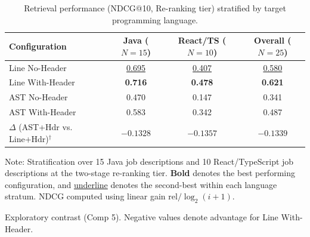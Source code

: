 \begin{table}[t]
\caption{Retrieval performance (NDCG@10, Re-ranking tier) stratified by target programming language.}
\label{tab:language_stratification}
\centering\footnotesize
\setlength{\tabcolsep}{10pt}
\begin{threeparttable}
\begin{tabular}{@{}lccc@{}}
\toprule
Configuration & Java ($N=15$) & React/TS ($N=10$) & Overall ($N=25$) \\
\midrule
Line No-Header & \underline{0.695} & \underline{0.407} & \underline{0.580} \\
Line With-Header & \textbf{0.716} & \textbf{0.478} & \textbf{0.621} \\
AST No-Header & 0.470 & 0.147 & 0.341 \\
AST With-Header & 0.583 & 0.342 & 0.487 \\
\midrule
$\Delta$ (AST+Hdr vs. Line+Hdr)$^{\dagger}$ & $-0.1328$ & $-0.1357$ & $-0.1339$ \\
\bottomrule
\end{tabular}
\begin{tablenotes}\footnotesize
\item[] Note: Stratification over 15 Java job descriptions and 10 React/TypeScript job descriptions at the two-stage re-ranking tier. \textbf{Bold} denotes the best performing configuration, and \underline{underline} denotes the second-best within each language stratum. NDCG computed using linear gain $\mathrm{rel}/\log_2(i+1)$.
\item[$^{\dagger}$] Exploratory contrast (Comp 5). Negative values denote advantage for Line With-Header.
\end{tablenotes}
\end{threeparttable}
\end{table}